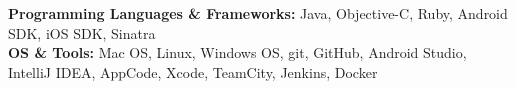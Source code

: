 

\begin{cvparagraph}

\textbf{Programming Languages \& Frameworks:} Java, Objective-C, Ruby, Android SDK, iOS SDK, Sinatra
\\[2pt]
\textbf{OS \& Tools:} Mac OS, Linux, Windows OS, git, GitHub, Android Studio, IntelliJ IDEA, AppCode, Xcode, TeamCity, Jenkins, Docker

\end{cvparagraph}